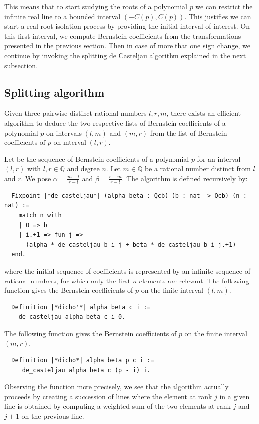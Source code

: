 \documentclass{mscs}
\begin{document}
This means that to start studying the roots of a polynomial $p$ we can
restrict the infinite real line to a bounded interval
$(- C(p), C(p))$. This justifies we can start a real root isolation
process by providing the initial interval of interest. On this first
interval, we compute Bernstein coefficients from the transformations
presented in the previous section. Then in case of more that one sign
change, we continue by invoking the splitting de Casteljau algorithm
explained in the next subsection.

\subsection{Splitting algorithm}\label{ssec:split}

Given three pairwise distinct rational numbers $l, r, m$,
there exists an efficient algorithm to deduce the two respective lists
of Bernstein coefficients of a polynomial $p$ on intervals $(l, m)$
and $(m, r)$ from the list of Bernstein coefficients of $p$ on
interval $(l, r)$.

Let  be the sequence of Bernstein coefficients of a polynomial $p$
for an interval \((l,r)\) with \(l, r\in \mathbb{Q}\) and degree \(n\).
Let $m\in \mathbb{Q}$ be a rational number
distinct from $l$ and $r$. We pose
$\alpha = \frac{m - l}{r - l}$ and $\beta = \frac{r - m}{r - l}$. The
 algorithm is defined recursively by:
\begin{lstlisting}
  Fixpoint |*de_casteljau*| (alpha beta : Qcb) (b : nat -> Qcb) (n : nat) :=
    match n with
    | O => b
    | i.+1 => fun j =>
      (alpha * de_casteljau b i j + beta * de_casteljau b i j.+1)
  end.
\end{lstlisting}
where the initial sequence of coefficients  is represented by an
infinite sequence of rational numbers, for which only the first $n$
elements are relevant.  The following function gives the Bernstein
coefficients of \(p\) on the finite interval \((l,m)\).
\begin{lstlisting}
  Definition |*dicho'*| alpha beta c i :=
    de_casteljau alpha beta c i 0.
\end{lstlisting}
The following function gives the Bernstein coefficients of \(p\) on the
finite interval \((m,r)\).
\begin{lstlisting}
  Definition |*dicho*| alpha beta p c i :=
     de_casteljau alpha beta c (p - i) i.
\end{lstlisting}

Observing the function 
more precisely, we see that the algorithm actually
proceeds by creating a succession of lines where the element at rank
\(j\) in a given line is obtained by computing a weighted sum of the two
elements at rank \(j\) and \(j+1\) on the previous line.
\end{document}
